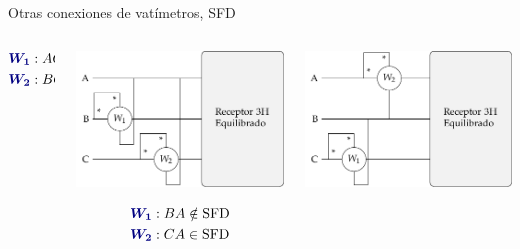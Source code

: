 \documentclass[aspectratio=169, usenames,svgnames,dvipsnames]{beamer}
\begin{document}
\begin{frame}{Otras conexiones de vatímetros, \hspace{3mm}SFD}
\begin{columns}
\begin{column}{0.33\columnwidth}
        \vspace{-8mm}
        \begin{align*}
          {\boldsymbol{\color{blue!50!black} W_1}}&: AC \notin \text{SFD}\\
          {\boldsymbol{\color{blue!50!black} W_2}}&: BC \in \text{SFD}
        \end{align*}
    \end{column}
    \begin{column}{0.33\columnwidth}
        \begin{center}
            \includegraphics[width=1\linewidth]{../figs/Potencia_3H_equilibrado_BC.pdf}
        \end{center}

        \vspace{-8mm}
        \begin{align*}
          {\boldsymbol{\color{blue!50!black} W_1}}&: BA \notin \text{SFD}\\
          {\boldsymbol{\color{blue!50!black} W_2}}&: CA \in \text{SFD}
        \end{align*}
    \end{column}    
    \begin{column}{0.33\columnwidth}
        \begin{center}
            \includegraphics[width=1\linewidth]{../figs/Potencia_3H_equilibrado_CA.pdf}
        \end{center}


\end{column}
\end{columns}
\end{frame}
\end{document}
